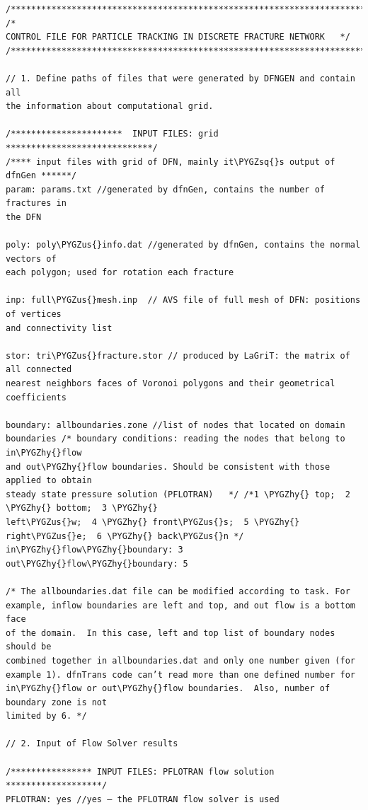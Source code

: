 \documentclass[letterpaper,10pt,english]{sphinxmanual}
\def\PYGZus{\char`\_}
\def\PYGZhy{\char`\-}
\def\PYGZsq{\char`\'}
\renewcommand\PYGZsq{\textquotesingle}
\begin{document}
\begin{Verbatim}[commandchars=\\\{\}]
/***********************************************************************/ /*
CONTROL FILE FOR PARTICLE TRACKING IN DISCRETE FRACTURE NETWORK   */
/***********************************************************************/

// 1. Define paths of files that were generated by DFNGEN and contain all
the information about computational grid.

/**********************  INPUT FILES: grid *****************************/
/**** input files with grid of DFN, mainly it\PYGZsq{}s output of dfnGen ******/
param: params.txt //generated by dfnGen, contains the number of fractures in
the DFN

poly: poly\PYGZus{}info.dat //generated by dfnGen, contains the normal vectors of
each polygon; used for rotation each fracture

inp: full\PYGZus{}mesh.inp  // AVS file of full mesh of DFN: positions of vertices
and connectivity list

stor: tri\PYGZus{}fracture.stor // produced by LaGriT: the matrix of all connected
nearest neighbors faces of Voronoi polygons and their geometrical
coefficients

boundary: allboundaries.zone //list of nodes that located on domain
boundaries /* boundary conditions: reading the nodes that belong to in\PYGZhy{}flow
and out\PYGZhy{}flow boundaries. Should be consistent with those applied to obtain
steady state pressure solution (PFLOTRAN)   */ /*1 \PYGZhy{} top;  2 \PYGZhy{} bottom;  3 \PYGZhy{}
left\PYGZus{}w;  4 \PYGZhy{} front\PYGZus{}s;  5 \PYGZhy{} right\PYGZus{}e;  6 \PYGZhy{} back\PYGZus{}n */ in\PYGZhy{}flow\PYGZhy{}boundary: 3
out\PYGZhy{}flow\PYGZhy{}boundary: 5

/* The allboundaries.dat file can be modified according to task. For
example, inflow boundaries are left and top, and out flow is a bottom face
of the domain.  In this case, left and top list of boundary nodes should be
combined together in allboundaries.dat and only one number given (for
example 1). dfnTrans code can’t read more than one defined number for
in\PYGZhy{}flow or out\PYGZhy{}flow boundaries.  Also, number of boundary zone is not
limited by 6. */

// 2. Input of Flow Solver results

/**************** INPUT FILES: PFLOTRAN flow solution *******************/
PFLOTRAN: yes //yes – the PFLOTRAN flow solver is used


\end{Verbatim}
\end{document}
